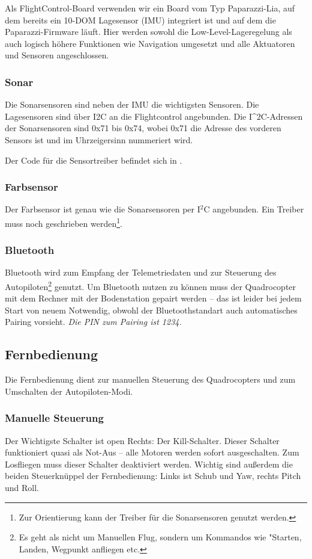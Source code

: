 Als FlightControl-Board verwenden wir ein Board vom Typ Paparazzi-Lia, auf dem bereits ein 10-DOM Lagesensor (IMU) integriert ist und auf dem die Paparazzi-Firmware läuft. Hier werden sowohl die Low-Level-Lageregelung als auch logisch höhere Funktionen wie Navigation umgesetzt und alle Aktuatoren und Sensoren angeschlossen.

\subsubsection{Sonar}
Die Sonarsensoren sind neben der IMU die wichtigsten Sensoren. Die Lagesensoren sind über I2C an die Flightcontrol angebunden.
Die I^$2$C-Adressen der Sonarsensoren sind 0x71 bis 0x74, wobei 0x71 die Adresse des vorderen Sensors ist und im Uhrzeigersinn nummeriert wird.

Der Code für die Sensortreiber befindet sich in .

\subsubsection{Farbsensor}
Der Farbsensor ist genau wie die Sonarsensoren per I$^2$C angebunden. Ein Treiber muss noch geschrieben werden\footnote{Zur Orientierung kann der Treiber für die Sonarsensoren genutzt werden.}.


\subsubsection{Bluetooth}
Bluetooth wird zum Empfang der Telemetriedaten und zur Steuerung des Autopiloten\footnote{Es geht als nicht um Manuellen Flug, sondern um Kommandos wie "Starten, Landen, Wegpunkt anfliegen etc.} genutzt.
Um Bluetooth nutzen zu können muss der Quadrocopter mit dem Rechner mit der Bodenstation gepairt werden – das ist leider bei jedem Start von neuem Notwendig, obwohl der Bluetoothstandart auch automatisches Pairing vorsieht.
\emph{Die PIN zum Pairing ist 1234.}


\subsection{Fernbedienung}
Die Fernbedienung dient zur manuellen Steuerung des Quadrocopters und zum Umschalten der Autopiloten-Modi.

\subsubsection{Manuelle Steuerung}
Der Wichtigste Schalter ist open Rechts: Der Kill-Schalter. Dieser Schalter funktioniert quasi als Not-Aus – alle Motoren werden sofort ausgeschalten.
Zum Losfliegen muss dieser Schalter deaktiviert werden.
Wichtig sind außerdem die beiden Steuerknüppel der Fernbedienung: Links ist Schub und Yaw, rechts Pitch und Roll.

